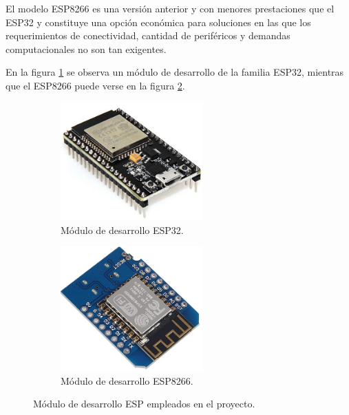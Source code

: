 
El modelo ESP8266 es una versión anterior y con menores prestaciones que el ESP32 y constituye una opción económica para soluciones en las que los requerimientos de conectividad, cantidad de periféricos y demandas computacionales no son tan exigentes.

En la figura \ref{fig:esp32} se observa un módulo de desarrollo de la familia ESP32, mientras que el ESP8266 puede verse en la figura \ref{fig:esp8266}. 


\begin{figure}[!htpb]
     \centering
     \begin{subfigure}[b]{0.45\textwidth}
		\centering
		\includegraphics[width=0.60\textwidth]{./Figures/esp32.jpg}
		\caption[Módulo de desarrollo ESP32]{Módulo de desarrollo ESP32.}
		\label{fig:esp32}
     \end{subfigure}
     \hfill
     \begin{subfigure}[b]{0.45\textwidth}
	\centering
		\includegraphics[width=0.60\textwidth]{./Figures/esp8266_2.jpg}
		\caption[Módulo de desarrollo ESP8266]{Módulo de desarrollo ESP8266.}
		\label{fig:esp8266}
     \end{subfigure}
     \hfill
        \caption[Módulo de desarrollo ESP empleados en el proyecto]{Módulo de desarrollo ESP empleados en el proyecto.}
        \label{fig:microESP}
\end{figure}





